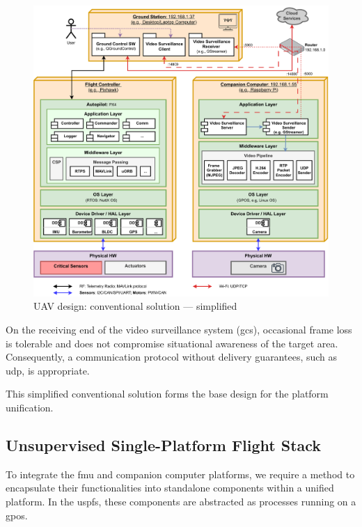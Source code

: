 \begin{figure}[!hbt]
  \centering
  \includegraphics[width=1.0\textwidth]{./img/pdf/uav-main-design-conv-sol-2.pdf} 
%   
  \caption{UAV design: conventional solution --- simplified}%
  \label{fig:uav-design-conv-sol-2}
\end{figure}

On the receiving end of the video surveillance system (\gls{gcs}), occasional frame loss is tolerable and does not compromise situational awareness of the target area. Consequently, a communication protocol without delivery guarantees, such as \gls{udp}, is appropriate.

This simplified conventional solution forms the base design for the platform
unification.

\subsection{Unsupervised Single-Platform Flight Stack}
\label{sec:unsuperv-stack}
To integrate the \gls{fmu} and companion computer platforms, we require a method to encapsulate their functionalities into standalone components within a unified platform. In the \acrfull{uspfs}, these components are abstracted as processes running on a \gls{gpos}.

